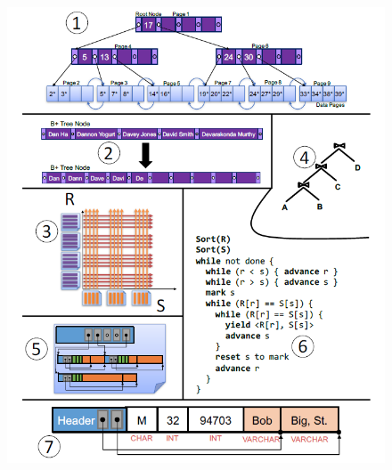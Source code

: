 \documentclass[10pt]{article}
\begin{document}
\begin{figure}
	\centering
	\includegraphics[width=.9\linewidth]{basics.png}
\end{figure}


\newpage
\end{document}
